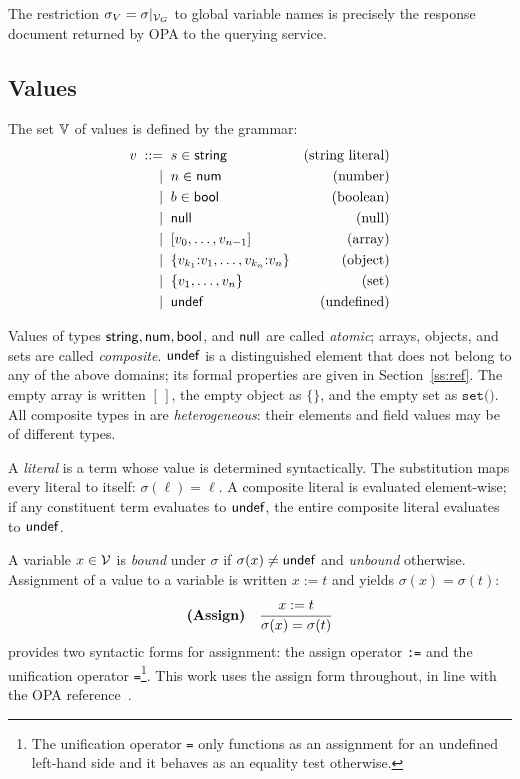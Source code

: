 The restriction $\sigma_V = \sigma|_{\mathcal{V}_G}$ to global variable names is precisely the response document returned by OPA to the querying service.


\subsection{Values}
\label{ss:vals}


The set $\mathbb{V}$ of \rego values is defined by the grammar:
\begin{align*}
v \;::=\;\;
  & s \in \mathsf{string}
    & \text{(string literal)} \\
  \mid\;\; & n \in \mathsf{num}
    & \text{(number)} \\
  \mid\;\; & b \in \mathsf{bool}
    & \text{(boolean)} \\
  \mid\;\; & \mathsf{null}
    & \text{(null)} \\
  \mid\;\; & [v_0, \ldots, v_{n-1}]
    & \text{(array)} \\
  \mid\;\; & \{v_{k_1}{:}v_1, \ldots, v_{k_n}{:}v_n\}
    & \text{(object)} \\
  \mid\;\; & \{v_1, \ldots, v_n\}
    & \text{(set)} \\
  \mid\;\; & \mathsf{undef}
    & \text{(undefined)}
\end{align*}

Values of types $\mathsf{string}, \mathsf{num}, \mathsf{bool}$, and $\mathsf{null}$ are called \emph{atomic}; arrays, objects, and sets are called \emph{composite}.
$\mathsf{undef}$ is a distinguished element that does not belong to any of the above domains; its formal properties are given in Section~\ref{ss:ref}.
The empty array is written $[\,]$, the empty object as $\{\}$, and the empty set as $\texttt{set()}$.
All composite types in \rego are \emph{heterogeneous}: their elements and field values may be of different types.

A \emph{literal} is a term whose value is determined syntactically.
The substitution maps every literal to itself: $\sigma(\ell) = \ell$.
A composite literal is evaluated element-wise; if any constituent term evaluates to $\mathsf{undef}$, the entire composite literal evaluates to $\mathsf{undef}$.

A variable $x \in \mathcal{V}$ is \emph{bound} under $\sigma$ if $\sigma(x) \neq \mathsf{undef}$ and \emph{unbound} otherwise.
Assignment of a value to a variable is written $x \mathrel{:=} t$ and yields $\sigma(x) = \sigma(t)$:
\[
\textbf{(Assign)}\quad
\inferrule{
  x \mathrel{:=} t
}{
  \sigma(x) = \sigma(t)
}
\]
\rego provides two syntactic forms for assignment: the assign operator \texttt{:=} and the unification operator \texttt{=}\footnote{
  The unification operator \texttt{=} only functions as an assignment for an undefined left-hand side and it behaves as an equality test otherwise.
}.
This work uses the assign form throughout, in line with the OPA reference~\cite{opa:web:ass}.

